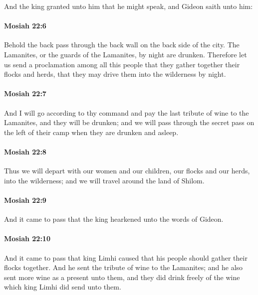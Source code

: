 			And the king granted unto him that he might speak,
			and Gideon saith unto him:

		\paragraph{Mosiah 22:6} %
			\label{MOSIAH-22-6}

			Behold the back pass through the back wall on the back side of the city.
			The Lamanites, or the guards of the Lamanites, by night are drunken.
			Therefore let us send a proclamation among all this people
			that they gather together their flocks and herds,
			that they may drive them into the wilderness by night.

		\paragraph{Mosiah 22:7} %
			\label{MOSIAH-22-7}

			And I will go according to thy command
			and pay the last tribute of wine to the Lamanites,
			and they will be drunken;
			and we will pass through the secret pass on the left of their camp
			when they are drunken and asleep.

		\paragraph{Mosiah 22:8} %
			\label{MOSIAH-22-8}

			Thus we will depart
			with our women and our children, our flocks and our herds,
			into the wilderness;
			and we will travel around the land of Shilom.

		\paragraph{Mosiah 22:9} %
			\label{MOSIAH-22-9}

			And it came to pass that the king hearkened unto the words of Gideon.

		\paragraph{Mosiah 22:10} %
			\label{MOSIAH-22-10}

			And it came to pass that king Limhi caused
			that his people should gather their flocks together.
			And he sent the tribute of wine to the Lamanites;
			and he also sent more wine as a present unto them,
			and they did drink freely of the wine which king Limhi did send unto them.


